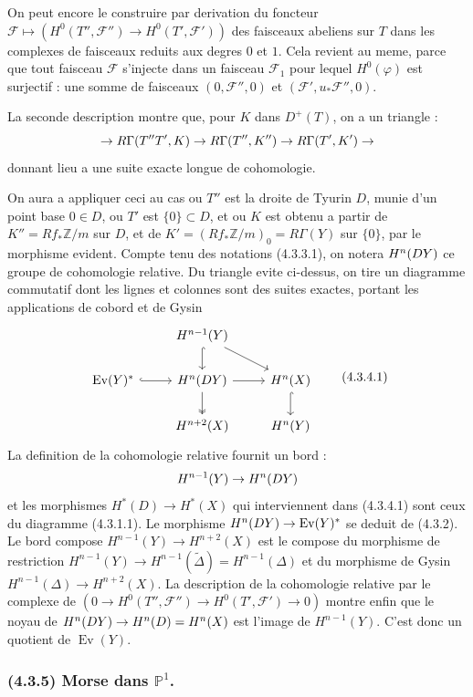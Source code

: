 \documentclass[12pt,a4paper]{article}
\theoremstyle{plain}
\theoremstyle{definition}
\theoremstyle{remark}
\DeclareMathOperator{\Ev}{Ev}
\let\mod\relax
\DeclareMathOperator{\mod}{mod}
\newcommand{\bbZ}{\mathbb{Z}}
\newcommand{\bbP}{\mathbb{P}}
\newcommand{\scrF}{\mathscr{F}}
\begin{document}
On peut encore le construire par derivation du foncteur $\scrF \mapsto (H^0(T'', \scrF'') \to H^0(T', \scrF'))$ des faisceaux abeliens sur $T$ dans les complexes de faisceaux reduits aux degres $0$ et $1$. Cela revient au meme, parce que tout faisceau $\scrF$ s'injecte dans un faisceau $\scrF_1$ pour lequel $H^0(\varphi)$ est surjectif : une somme de faisceaux $(0, \scrF'', 0)$ et $(\scrF', u_*\scrF'', 0)$.

La seconde description montre que, pour $K$ dans $D^+(T)$, on a un triangle :
\[
\to R\Gamma(T'' \mod T', K) \to R\Gamma(T'', K'') \to R\Gamma(T', K') \to
\]
donnant lieu a une suite exacte longue de cohomologie.


On aura a appliquer ceci au cas ou $T''$ est la droite de Tyurin $D$, munie d'un point base $0 \in D$, ou $T'$ est $\{0\} \subset D$, et ou $K$ est obtenu a partir de $K'' = Rf_*\bbZ/m$ sur $D$, et de $K' = (Rf_*\bbZ/m)_0 = R\Gamma(Y)$ sur $\{0\}$, par le morphisme evident. Compte tenu des notations (4.3.3.1), on notera $H^n(D \mod Y)$ ce groupe de cohomologie relative. Du triangle evite ci-dessus, on tire un diagramme commutatif dont les lignes et colonnes sont des suites exactes, portant les applications de cobord et de Gysin
\[
\begin{tikzcd}
& H^{n-1}(Y) \arrow[d, hook] \arrow[dr] & \\
\Ev(Y)^* \arrow[r, hook] & H^n(D \mod Y) \arrow[r] \arrow[d, two heads] & H^n(X) \arrow[d, hook] \\
& H^{n+2}(X) & H^n(Y)
\end{tikzcd}
\tag{4.3.4.1}
\]
La definition de la cohomologie relative fournit un bord :
\[
H^{n-1}(Y) \to H^n(D \mod Y)
\]
et les morphismes $H^*(D) \to H^*(X)$ qui interviennent dans (4.3.4.1) sont ceux du diagramme (4.3.1.1). Le morphisme $H^n(D \mod Y) \to \Ev(Y)^*$ se deduit de (4.3.2). Le bord compose $H^{n-1}(Y) \to H^{n+2}(X)$ est le compose du morphisme de restriction $H^{n-1}(Y) \to H^{n-1}(\widetilde{\Delta}) = H^{n-1}(\Delta)$ et du morphisme de Gysin $H^{n-1}(\Delta) \to H^{n+2}(X)$. La description de la cohomologie relative par le complexe de $(0 \to H^0(T'', \scrF'') \to H^0(T', \scrF') \to 0)$ montre enfin que le noyau de $H^n(D \mod Y) \to H^n(D) = H^n(X)$ est l'image de $H^{n-1}(Y)$. C'est donc un quotient de $\Ev(Y)$.

\subsubsection*{\textup{(4.3.5)} Morse dans $\bbP^1$.}
\end{document}
